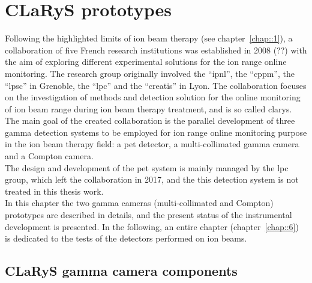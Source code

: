 \chapter{CLaRyS prototypes}\label{chap::3}


\vfill

\minitoc

\newpage

\glsresetall


Following the highlighted limits of ion beam therapy (see chapter~\ref{chap::1}), a collaboration of five French research institutions was established in 2008 (??) with the aim of exploring different experimental solutions for the ion range online monitoring. The research group originally involved the \enquote{\gls{ipnl}}, the \enquote{\gls{cppm}}, the \enquote{\gls{lpsc}} in Grenoble, the \enquote{\gls{lpc}} and the \enquote{\gls{creatis}} in Lyon. The collaboration focuses on the investigation of methods and detection solution for the online monitoring of ion beam range during ion beam therapy treatment, and is so called \gls{clarys}.\\
The main goal of the created collaboration is the parallel development of three gamma detection systems to be employed for ion range online monitoring purpose in the ion beam therapy field: a \gls{pet} detector, a multi-collimated gamma camera and a Compton camera.\\ The design and development of the \gls{pet} system is mainly managed by the \gls{lpc} group, which left the collaboration in 2017, and the this detection system is not treated in this thesis work.\\ 
In this chapter the two gamma cameras (multi-collimated and Compton) prototypes are described in details, and the present status of the instrumental development is presented. In the following, an entire chapter (chapter~\ref{chap::6}) is dedicated to the tests of the detectors performed on ion beams. 

\section{CLaRyS gamma camera components}\label{chap3::sec::CLaRyScameras}

